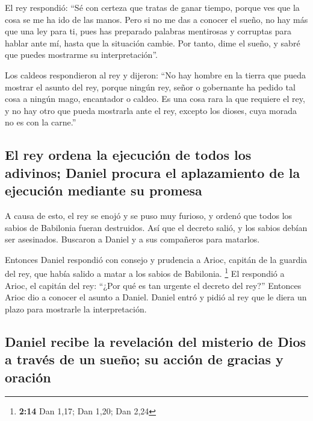  El rey respondió: ``Sé con certeza que tratas de ganar
tiempo, porque ves que la cosa se me ha ido de las manos. 
Pero si no me das a conocer el sueño, no hay más que una ley para ti,
pues has preparado palabras mentirosas y corruptas para hablar ante mí,
hasta que la situación cambie. Por tanto, dime el sueño, y sabré que
puedes mostrarme su interpretación''.

 Los caldeos respondieron al rey y dijeron: ``No hay
hombre en la tierra que pueda mostrar el asunto del rey, porque ningún
rey, señor o gobernante ha pedido tal cosa a ningún mago, encantador o
caldeo.  Es una cosa rara la que requiere el rey, y no
hay otro que pueda mostrarla ante el rey, excepto los dioses, cuya
morada no es con la carne.''

\hypertarget{el-rey-ordena-la-ejecuciuxf3n-de-todos-los-adivinos-daniel-procura-el-aplazamiento-de-la-ejecuciuxf3n-mediante-su-promesa}{%
\subsection{El rey ordena la ejecución de todos los adivinos; Daniel
procura el aplazamiento de la ejecución mediante su
promesa}\label{el-rey-ordena-la-ejecuciuxf3n-de-todos-los-adivinos-daniel-procura-el-aplazamiento-de-la-ejecuciuxf3n-mediante-su-promesa}}

 A causa de esto, el rey se enojó y se puso muy furioso,
y ordenó que todos los sabios de Babilonia fueran destruidos.
 Así que el decreto salió, y los sabios debían ser
asesinados. Buscaron a Daniel y a sus compañeros para matarlos.

 Entonces Daniel respondió con consejo y prudencia a
Arioc, capitán de la guardia del rey, que había salido a matar a los
sabios de Babilonia. \footnote{\textbf{2:14} Dan 1,17; Dan 1,20; Dan
  2,24}  El respondió a Arioc, el capitán del rey: ``¿Por
qué es tan urgente el decreto del rey?'' Entonces Arioc dio a conocer el
asunto a Daniel.  Daniel entró y pidió al rey que le
diera un plazo para mostrarle la interpretación.

\hypertarget{daniel-recibe-la-revelaciuxf3n-del-misterio-de-dios-a-travuxe9s-de-un-sueuxf1o-su-acciuxf3n-de-gracias-y-oraciuxf3n}{%
\subsection{Daniel recibe la revelación del misterio de Dios a través de
un sueño; su acción de gracias y
oración}\label{daniel-recibe-la-revelaciuxf3n-del-misterio-de-dios-a-travuxe9s-de-un-sueuxf1o-su-acciuxf3n-de-gracias-y-oraciuxf3n}}


